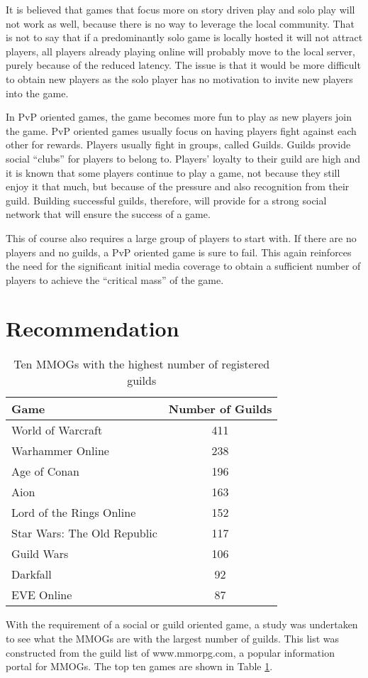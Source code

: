\documentclass[journal,oneside,a4paper,onecolumn]{IEEEtran}
\begin{document}
It is believed that games that focus more on story driven play and solo play will not work as well, because there is no way to leverage the local
community. That is not to say that if a predominantly solo game is locally hosted it will not attract players, all players already playing online
will probably move to the local server, purely because of the reduced latency. The issue is that it would be more difficult to obtain new players as
the solo player has no motivation to invite new players into the game.

In \ac{PvP} oriented games, the game becomes more fun to play as new players join the game. \ac{PvP} oriented games usually focus on having players
fight against each other for rewards. Players usually fight in groups, called Guilds. Guilds provide social ``clubs'' for players to belong to.
Players' loyalty to their guild are high and it is known that some players continue to play a game, not because they still enjoy it that much, but
because of the pressure and also recognition from their guild. Building successful guilds, therefore, will provide for a strong social network that
will ensure the success of a game.

This of course also requires a large group of players to start with. If there are no players and no guilds, a \ac{PvP} oriented game is sure to fail.
This again reinforces the need for the significant initial media coverage to obtain a sufficient number of players to achieve the ``critical mass''
of the game.

\section{Recommendation}

\begin{table}[htbp]
\centering
\begin{tabular}{|l|c|}
  \hline
  Game & Number of Guilds \\
  \hline  \hline
  World of Warcraft & 411 \\
  \hline
  Warhammer Online & 238 \\
  \hline
  Age of Conan & 196 \\
  \hline
  Aion & 163 \\
  \hline
  Lord of the Rings Online & 152 \\
  \hline
  Star Wars: The Old Republic & 117 \\
  \hline
  Guild Wars & 106 \\
  \hline
  Darkfall & 92 \\
  \hline
  EVE Online & 87 \\
  \hline
\end{tabular}
\caption{Ten MMOGs with the highest number of registered guilds} \label{tab_guilds}
\end{table}
%
With the requirement of a social or guild oriented game, a study was undertaken to see what the MMOGs are with the largest number of guilds. This
list was constructed from the guild list of www.mmorpg.com, a popular information portal for MMOGs. The top ten games are shown in Table
\ref{tab_guilds}.
\end{document}
